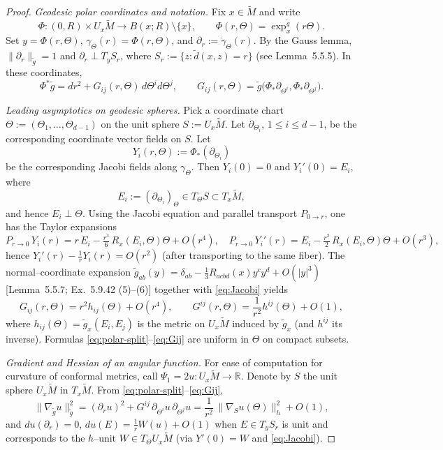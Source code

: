 \documentclass{amsart}
\let\oldcitet\citet
\renewcommand{\citet}[1]{\textcolor{blue}{\oldcitet{#1}}}
\theoremstyle{definition}
\theoremstyle{remark}
\newcommand{\cl}{\mathbb{R}}
\newcommand{\0}{\boldsymbol{0}}
\begin{document}
\begin{proof}
\emph{Geodesic polar coordinates and notation.}
Fix $x\in\widetilde M$ and write
\[
\Phi:(0,R)\times U_x\widetilde M\to B(x;R)\setminus \{x\},\qquad \Phi(r,\Theta)=\exp_x^{\tilde g}(r\Theta).
\]
Set $y=\Phi(r,\Theta)$, $\gamma_\Theta(r)=\Phi(r,\Theta)$, and $\partial_r:=\dot\gamma_\Theta(r)$. 
By the Gauss lemma, $\|\partial_r\|_{\widetilde g}=1$ and $\partial_r\perp T_yS_r$, where $S_r:=\{z:\widetilde d(x,z)=r\}$ 
\citet{Petersen2016}(see Lemma~5.5.5). In these coordinates,
\begin{equation}\label{eq:polar-split}
\Phi^*\widetilde g = dr^2 + G_{ij}(r,\Theta)\,d\Theta^i d\Theta^j,
\qquad 
G_{ij}(r,\Theta)=\widetilde g\bigl(\Phi_*\partial_{\Theta^i},\Phi_*\partial_{\Theta^j}\bigr).
\end{equation}

\emph{Leading asymptotics on geodesic spheres.}
Pick a coordinate chart $\Theta:=(\Theta_1,\dots,\Theta_{d-1})$ on the unit sphere $S:=U_x\widetilde M$. Let $\partial_{\Theta_i}$, $1\le i\le d-1$, be the corresponding coordinate vector fields on $S$. Let \[ Y_i(r,\Theta):=\Phi_*(\partial_{\Theta_i}) \] be the corresponding Jacobi fields along $\gamma_\Theta$. Then $Y_i(0)=0$ and $Y_i'(0)=E_i$, where \[ E_i:=(\partial_{\Theta_i})_\Theta\in T_\Theta S\subset T_x\widetilde M, \] and hence $E_i\perp\Theta$.
Using the Jacobi equation and parallel transport $P_{0\to r}$, one has the Taylor expansions
\begin{equation}\label{eq:Jacobi}
P_{r\to 0}\,Y_i(r)= r\,E_i - \tfrac{r^3}{6}\,R_x(E_i,\Theta)\Theta + O(r^4),
\quad
P_{r\to 0}\,Y_i'(r)= E_i - \tfrac{r^2}{2}\,R_x(E_i,\Theta)\Theta + O(r^3),
\end{equation}
hence $Y_i'(r)-\frac1rY_i(r)=O(r^2)$ (after transporting to the same fiber). 
The normal–coordinate expansion $\widetilde g_{ab}(y)=\delta_{ab}-\frac13 R_{acbd}(x)y^cy^d+O(|y|^3)$
\citet{Petersen2016}[Lemma~5.5.7; Ex.~5.9.42 (5)--(6)] together with \eqref{eq:Jacobi} yields
\begin{equation}\label{eq:Gij}
G_{ij}(r,\Theta)=r^2 h_{ij}(\Theta)+O(r^4),\qquad 
G^{ij}(r,\Theta)=\frac1{r^2}h^{ij}(\Theta)+O(1),
\end{equation}
where $h_{ij}(\Theta)=\widetilde g_x(E_i,E_j)$ is the metric on $U_x\widetilde M$ induced by $\widetilde g_x$ (and $h^{ij}$ its inverse). 
Formulas \eqref{eq:polar-split}–\eqref{eq:Gij} are uniform in $\Theta$ on compact subsets.

\emph{Gradient and Hessian of an angular function.}
For ease of computation for curvature of conformal metrics, call $\Psi_1=2u:U_x\widetilde M \to \cl$. Denote by $S$ the unit sphere $U_x\widetilde{M}$ in $T_x\widetilde{M}.$ From \eqref{eq:polar-split}–\eqref{eq:Gij},
\begin{equation}\label{eq:grad2}
\|\nabla_{\widetilde g} u\|_{\widetilde g}^2
=(\partial_r u)^2+G^{ij}\,\partial_{\Theta^i}u\,\partial_{\Theta^j}u
=\frac1{r^2}\,\|\nabla_S u(\Theta)\|_{h}^2 + O(1),
\end{equation}
and $du(\partial_r)=0$, $du(E)=\frac1{r}W(u)+O(1)$ when $E\in T_yS_r$ is unit and corresponds to the $h$–unit $W\in T_\Theta U_x\widetilde M$ (via $Y'(0)=W$ and \eqref{eq:Jacobi}). 


\end{proof}
\end{document}

